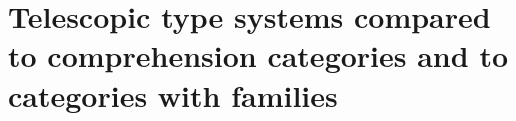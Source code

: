 \begin{comment}
In the following definition $\Delta(X)$ denotes the discrete category on the set
$X$ and $\mathbf{2}$ is the category $s\to t$.
\begin{defn}
Define $\mathbb{S}$ to be the pushout
\begin{equation*}
\begin{tikzcd}[column sep=large]
\Delta(\mathbb{N}) \arrow[r,"{n\mapsto(n,s)}"] \arrow[d,swap,"i"] & \Delta(\mathbb{N})\times\mathbf{2} \arrow[d] \\
(\mathbb{N},\leq) \arrow[r] & \mathbb{S}
\end{tikzcd}
\end{equation*}
in $\mathbf{Cat}$.
\end{defn}

Note that for any $n\in\mathbb{N}$, we have the map $S^n := (m\mapsto m+n)$ which
is monotone. By the universal property of pushouts, we obtain a functor $\sigma^n:\mathbb{S}\to\mathbb{S}$
given by
\begin{equation*}
\begin{tikzcd}[column sep=huge]
\Delta(\mathbb{N}) 
  \arrow[r,"{n\mapsto(n,s)}"] 
  \arrow[d,swap,"i"] 
  & 
\Delta(\mathbb{N})\times\mathbf{2} 
  \arrow[d]
  \arrow[r,"{\Delta(S^n)\times\catid{\mathbf{2}}}"]
  &
\Delta(\mathbb{N})\times\mathbf{2}
  \arrow[dd]
  \\
(\mathbb{N},\leq) 
  \arrow[r] 
  \arrow[d,swap,"{(S^n,\leq)}"]
  & 
\mathbb{S}
  \arrow[dr,densely dotted,yshift=.5ex,"\sigma^n"]
  \\
(\mathbb{N},\leq)
  \arrow[rr] & &
\mathbb{S}
\end{tikzcd}
\end{equation*}

\begin{defn}
A non-unital pre-B0-system is a presheaf $B$ on $\mathbb{S}$ such that $B(0)$ is
a singleton, and the following additional structure:
\begin{enumerate}
\item For any $n\in\mathbb{N}$ and $X\in B(n)$, write $B/X$ for the sub-presheaf
of $B\circ\sigma^n$ given by $B/X(0)=\{X\}$ and $B/X(n+1)=B_{n\leq n+1}^{-1}(B/X(n))$. 
We require that for any $n\in\mathbb{N}$ and any $A\in B(n+1)$, there is a 
natural transformation $W_A:B/(B_{n\leq n+1}(A))\Rightarrow B/A$.
\end{enumerate}
\end{defn}
\end{comment}

\section{Telescopic type systems compared to comprehension categories and to categories with families}
